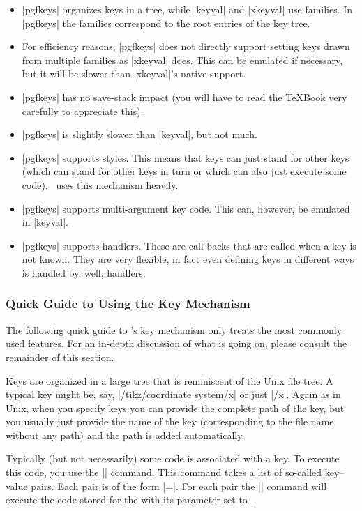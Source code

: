 \begin{itemize}
\item |pgfkeys| organizes keys in a tree, while |keyval| and |xkeyval|
  use families. In |pgfkeys| the families correspond to the root
  entries of the key tree.
\item For efficiency reasons, |pgfkeys| does not directly support
  setting keys drawn from multiple families as |xkeyval| does. This
  can be emulated if necessary, but it will be slower than |xkeyval|'s
  native support.
\item |pgfkeys| has no save-stack impact (you will have to read the
  \TeX Book very carefully to appreciate this).
\item |pgfkeys| is slightly slower than |keyval|, but not much.
\item |pgfkeys| supports styles. This means that keys can just stand
  for other keys (which can stand for other keys in turn or which can
  also just execute some code). \tikzname\ uses this mechanism heavily.
\item |pgfkeys| supports multi-argument key code. This can, however,
  be emulated in |keyval|.
\item |pgfkeys| supports handlers. These are call-backs that are
  called when a key is not known. They are very flexible, in fact even
  defining keys in different ways is handled by, well, handlers.
\end{itemize}


\subsubsection{Quick Guide to Using the Key Mechanism}

The following quick guide to \pgfname's key mechanism only treats the
most commonly used features. For an in-depth discussion of what is
going on, please consult the remainder of this section.

Keys are organized in a large tree that is reminiscent of the Unix
file tree. A typical key might be, say, |/tikz/coordinate system/x|
or just |/x|. Again as in Unix, when you specify keys you can provide
the complete path of the key, but you usually just provide the name of
the key (corresponding to the file name without any path) and the path
is added automatically.

Typically (but not necessarily) some code is associated with a key. To
execute this code, you use the |\pgfkeys| command. This command takes
a list of so-called key--value pairs. Each pair is of the form
|=|. For each pair the |\pgfkeys| command will
execute the code stored for the  with its parameter set to
.

